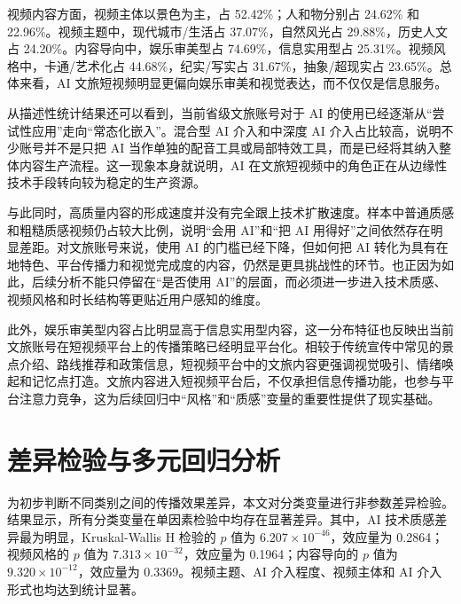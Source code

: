 视频内容方面，视频主体以景色为主，占 52.42\%；人和物分别占 24.62\% 和 22.96\%。视频主题中，现代城市/生活占 37.07\%，自然风光占 29.88\%，历史人文占 24.20\%。内容导向中，娱乐审美型占 74.69\%，信息实用型占 25.31\%。视频风格中，卡通/艺术化占 44.68\%，纪实/写实占 31.67\%，抽象/超现实占 23.65\%。总体来看，AI 文旅短视频明显更偏向娱乐审美和视觉表达，而不仅仅是信息服务。

从描述性统计结果还可以看到，当前省级文旅账号对于 AI 的使用已经逐渐从“尝试性应用”走向“常态化嵌入”。混合型 AI 介入和中深度 AI 介入占比较高，说明不少账号并不是只把 AI 当作单独的配音工具或局部特效工具，而是已经将其纳入整体内容生产流程。这一现象本身就说明，AI 在文旅短视频中的角色正在从边缘性技术手段转向较为稳定的生产资源。

与此同时，高质量内容的形成速度并没有完全跟上技术扩散速度。样本中普通质感和粗糙质感视频仍占较大比例，说明“会用 AI”和“把 AI 用得好”之间依然存在明显差距。对文旅账号来说，使用 AI 的门槛已经下降，但如何把 AI 转化为具有在地特色、平台传播力和视觉完成度的内容，仍然是更具挑战性的环节。也正因为如此，后续分析不能只停留在“是否使用 AI”的层面，而必须进一步进入技术质感、视频风格和时长结构等更贴近用户感知的维度。

此外，娱乐审美型内容占比明显高于信息实用型内容，这一分布特征也反映出当前文旅账号在短视频平台上的传播策略已经明显平台化。相较于传统宣传中常见的景点介绍、路线推荐和政策信息，短视频平台中的文旅内容更强调视觉吸引、情绪唤起和记忆点打造。文旅内容进入短视频平台后，不仅承担信息传播功能，也参与平台注意力竞争，这为后续回归中“风格”和“质感”变量的重要性提供了现实基础。

\section{差异检验与多元回归分析}

为初步判断不同类别之间的传播效果差异，本文对分类变量进行非参数差异检验。结果显示，所有分类变量在单因素检验中均存在显著差异。其中，AI 技术质感差异最为明显，Kruskal-Wallis H 检验的 $p$ 值为 $6.207\times 10^{-46}$，效应量为 0.2864；视频风格的 $p$ 值为 $7.313\times 10^{-32}$，效应量为 0.1964；内容导向的 $p$ 值为 $9.320\times 10^{-12}$，效应量为 0.3369。视频主题、AI 介入程度、视频主体和 AI 介入形式也均达到统计显著。

